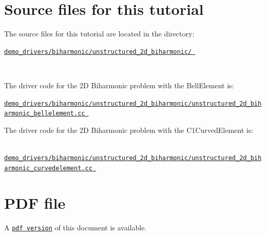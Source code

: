  

\hypertarget{index_sources}{}\section{Source files for this tutorial}\label{index_sources}

\begin{DoxyItemize}
\item The source files for this tutorial are located in the directory\+:~\newline
~\newline
\begin{center} \href{../../../../demo_drivers/biharmonic/unstructured_2d_biharmonic/}{\tt demo\+\_\+drivers/biharmonic/unstructured\+\_\+2d\+\_\+biharmonic/ } \end{center} ~\newline

\item The driver code for the 2D Biharmonic problem with the {\ttfamily Bell\+Element} is\+: ~\newline
~\newline
\begin{center} \href{
../../../../
demo_drivers/biharmonic/unstructured_2d_biharmonic/unstructured_2d_biharmonic_bellelement.cc
}{\tt demo\+\_\+drivers/biharmonic/unstructured\+\_\+2d\+\_\+biharmonic/unstructured\+\_\+2d\+\_\+biharmonic\+\_\+bellelement.\+cc } \end{center} 
\item The driver code for the 2D Biharmonic problem with the {\ttfamily C1\+Curved\+Element} is\+: ~\newline
~\newline
\begin{center} \href{
../../../../
demo_drivers/biharmonic/unstructured_2d_biharmonic/unstructured_2d_biharmonic_curvedelement.cc
}{\tt demo\+\_\+drivers/biharmonic/unstructured\+\_\+2d\+\_\+biharmonic/unstructured\+\_\+2d\+\_\+biharmonic\+\_\+curvedelement.\+cc } \end{center} 
\end{DoxyItemize}

 

 \hypertarget{index_pdf}{}\section{P\+D\+F file}\label{index_pdf}
A \href{../latex/refman.pdf}{\tt pdf version} of this document is available. 
